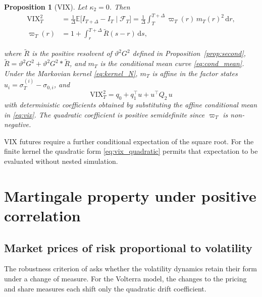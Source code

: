 \documentclass{rQUF2e}
\theoremstyle{plain}
\newtheorem{proposition}[theorem]{Proposition}
\theoremstyle{definition}
\theoremstyle{remark}
\newcommand{\D}{\mathrm{d}}
\newcommand{\E}{\mathbb{E}}
\newcommand{\F}{\mathcal{F}}
\newcommand{\VIX}{\mathrm{VIX}}
\begin{document}
\begin{proposition}[VIX]\label{prop:vix}
Let $\kappa_2=0$. Then
\begin{equation}\label{eq:vix}
\begin{split}
\VIX_T^2&=\frac1\Delta\E\big[I_{T+\Delta}-I_T\mid\F_T\big]=\frac1\Delta\int_T^{T+\Delta}\varpi_T(r)\,m_T(r)^2\,\D r,\\
\varpi_T(r)&=1+\int_r^{T+\Delta}\widetilde R(s-r)\,\D s ,
\end{split}
\end{equation}

where $\widetilde R$ is the positive resolvent of $\vartheta^2G^2$ defined in Proposition~\ref{prop:second}, $\widetilde R=\vartheta^2G^2+\vartheta^2G^2*\widetilde R$, and $m_T$ is the conditional mean curve \eqref{eq:cond_mean}. Under the Markovian kernel \eqref{eq:kernel_N}, $m_T$ is affine in the factor states $u_i=\sigma^{(i)}_T-\sigma_{0,i}$, and
\begin{equation}\label{eq:vix_quadratic}
\VIX_T^2=q_0+q_1^\top u+u^\top Q_2\,u
\end{equation}
with deterministic coefficients obtained by substituting the affine conditional mean in \eqref{eq:vix}. The quadratic coefficient is positive semidefinite since $\varpi_T$ is non-negative.
\end{proposition}

VIX futures require a further conditional expectation of the square root. For the finite kernel the quadratic form \eqref{eq:vix_quadratic} permits that expectation to be evaluated without nested simulation.
\section{Martingale property under positive correlation}\label{sec:measure}

\subsection{Market prices of risk proportional to volatility}

The robustness criterion of \citet{SeppRakhmonov2026} asks whether the volatility dynamics retain their form under a change of measure. For the Volterra model, the changes to the pricing and share measures each shift only the quadratic drift coefficient.
\end{document}
